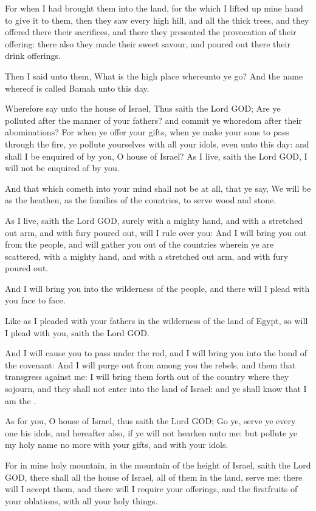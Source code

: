 \Verse For when I had brought them into the land, for the which I lifted up mine hand to give it to them, then they saw every high hill, and all the thick trees, and they offered there their sacrifices, and there they presented the provocation of their offering: there also they made their sweet savour, and poured out there their drink offerings.

\Verse Then I said unto them, What is the high place whereunto ye go?  And the name whereof is called Bamah unto this day.

\Verse Wherefore say unto the house of Israel, Thus saith the Lord GOD; Are ye polluted after the manner of your fathers? and commit ye whoredom after their abominations?  \Verse For when ye offer your gifts, when ye make your sons to pass through the fire, ye pollute yourselves with all your idols, even unto this day: and shall I be enquired of by you, O house of Israel? As I live, saith the Lord GOD, I will not be enquired of by you.

\Verse And that which cometh into your mind shall not be at all, that ye say, We will be as the heathen, as the families of the countries, to serve wood and stone.

\Verse As I live, saith the Lord GOD, surely with a mighty hand, and with a stretched out arm, and with fury poured out, will I rule over you: \Verse And I will bring you out from the people, and will gather you out of the countries wherein ye are scattered, with a mighty hand, and with a stretched out arm, and with fury poured out.

\Verse And I will bring you into the wilderness of the people, and there will I plead with you face to face.

\Verse Like as I pleaded with your fathers in the wilderness of the land of Egypt, so will I plead with you, saith the Lord GOD.

\Verse And I will cause you to pass under the rod, and I will bring you into the bond of the covenant: \Verse And I will purge out from among you the rebels, and them that transgress against me: I will bring them forth out of the country where they sojourn, and they shall not enter into the land of Israel: and ye shall know that I am the \LORD.

\Verse As for you, O house of Israel, thus saith the Lord GOD; Go ye, serve ye every one his idols, and hereafter also, if ye will not hearken unto me: but pollute ye my holy name no more with your gifts, and with your idols.

\Verse For in mine holy mountain, in the mountain of the height of Israel, saith the Lord GOD, there shall all the house of Israel, all of them in the land, serve me: there will I accept them, and there will I require your offerings, and the firstfruits of your oblations, with all your holy things.

